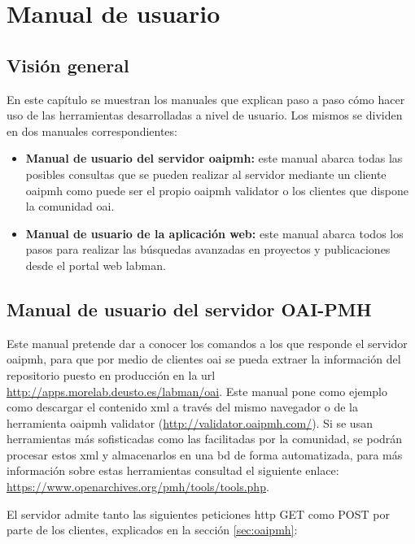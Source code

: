 \chapter{Manual de usuario}

\section{Visión general}

En este capítulo se muestran los manuales que explican paso a paso cómo hacer uso de las herramientas desarrolladas a nivel de usuario. Los mismos se dividen en dos manuales correspondientes:

\begin{itemize}
	\item \textbf{Manual de usuario del servidor \acrshort{oaipmh}:} este manual abarca todas las posibles consultas que se pueden realizar al servidor mediante un cliente \acrshort{oaipmh} como puede ser el propio \acrshort{oaipmh} validator o los clientes que dispone la comunidad \acrshort{oai}.
	\item \textbf{Manual de usuario de la aplicación web:} este manual abarca todos los pasos para realizar las búsquedas avanzadas en proyectos y publicaciones desde el portal web \acrshort{labman}.
\end{itemize}

\section{Manual de usuario del servidor OAI-PMH}

Este manual pretende dar a conocer los comandos a los que responde el servidor \acrshort{oaipmh}, para que por medio de clientes \acrshort{oai} se pueda extraer la información del repositorio puesto en producción en la \acrshort{url} \url{http://apps.morelab.deusto.es/labman/oai}. Este manual pone como ejemplo como descargar el contenido \acrshort{xml} a través del mismo navegador o de la herramienta \acrshort{oaipmh} validator (\url{http://validator.oaipmh.com/}). Si se usan herramientas más sofisticadas como las facilitadas por la comunidad, se podrán procesar estos \acrshort{xml} y almacenarlos en una \acrshort{bd} de forma automatizada, para más información sobre estas herramientas consultad el siguiente enlace: \url{https://www.openarchives.org/pmh/tools/tools.php}.

El servidor admite tanto las siguientes peticiones \acrshort{http} GET como POST por parte de los clientes, explicados en la sección \ref{sec:oaipmh}:

